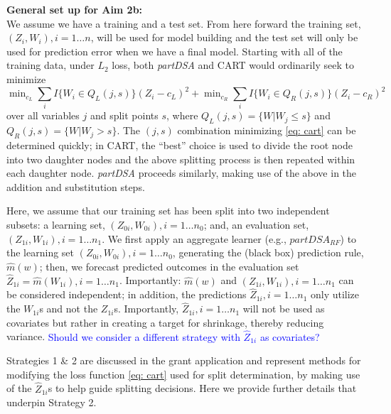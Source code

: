 \documentclass[12pt]{article}
\begin{document}
{\bf General set up for Aim 2b:}\\


We assume we have a training and a test set. From here forward the training set, $(Z_i,W_i), i = 1 \ldots n$, will be used for model building and the test set will only be used for prediction error when we have a final model. Starting with all of the training data, under $L_2$ loss,
both \emph{partDSA} and CART would ordinarily seek to minimize
\begin{equation} \label{eq: cart}
	\min\nolimits_{c_L} {\textstyle \sum\nolimits}_i I\{ W_{i} \in Q_{L}(j,s) \} (Z_{i}-c_L)^2
	+ \min\nolimits_{c_R} {\textstyle \sum\nolimits}_i
	I\{ W_{i} \in Q_{R}(j,s) \}
	(Z_{i}-c_R)^2
\end{equation}
over all variables $j$ and split points $s$, where
$Q_{L}(j,s) = \{W|W_{j} \leq s\}$ and $Q_{R}(j,s) = \{W|W_{j} >
s\}$.  %
The $(j,s)$ combination minimizing \eqref{eq: cart} can be determined
quickly; in CART, the ``best'' choice is used to divide the root node into
two daughter nodes and the above splitting process is then repeated
within each daughter node. \emph{partDSA} proceeds similarly, making use of the
above in the addition and substitution steps. 

Here, we assume that our training set has been split into two independent
subsets: a learning set, $(Z_{0i},W_{0i}), i = 1 \ldots n_0$; and, an evaluation set,
$(Z_{1i}, W_{1i}), i = 1 \ldots n_1$. We first apply an aggregate
learner (e.g., $partDSA_{RF}$) to the learning set $(Z_{0i}, W_{0i}),
i = 1 \ldots n_0$, generating the (black box) prediction rule,
$\hat{m}(w)$; then, we forecast predicted outcomes in the evaluation set
$\widehat{Z}_{1i} = \hat{m}(W_{1i}), i = 1 \ldots n_1$.  Importantly:
$\hat{m}(w)$ and $(Z_{1i}, W_{1i}), i = 1 \ldots n_1$ can be
considered independent; in addition, the predictions
$\widehat{Z}_{1i}, i = 1 \ldots n_1$ only utilize the $W_{1i}$s and not
the $Z_{1i}$s. Importantly, $\widehat{Z}_{1i}, i = 1 \ldots n_1$ will
not be used as covariates but rather in creating a target for
shrinkage, thereby reducing variance. \textcolor{blue}{Should we consider a different strategy with $\widehat{Z}_{1i}$ as covariates?}

 Strategies 1 \& 2 are
discussed in the grant application and represent methods for modifying
the loss function \eqref{eq: cart} used for split determination,
by making use of the $\widehat{Z}_{1i}$s to help guide splitting
decisions. Here we provide further details that underpin
Strategy 2.\\
\end{document}
